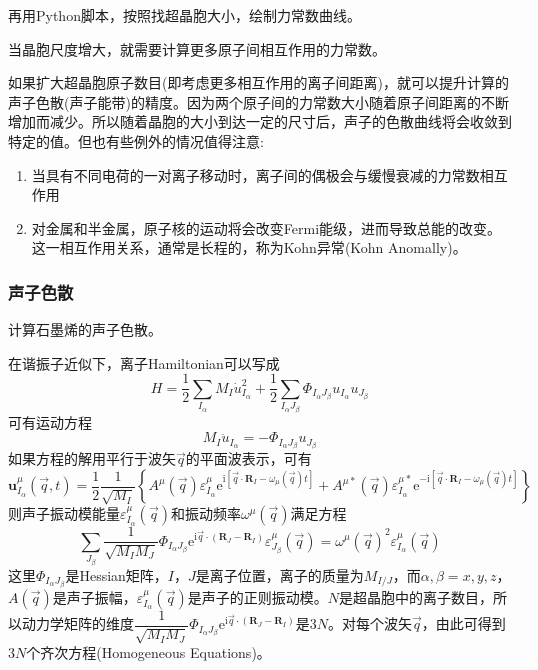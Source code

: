 再用\textrm{Python}脚本，按照找超晶胞大小，绘制力常数曲线。

当晶胞尺度增大，就需要计算更多原子间相互作用的力常数。

如果扩大超晶胞原子数目(即考虑更多相互作用的离子间距离)，就可以提升计算的声子色散(声子能带)的精度。因为两个原子间的力常数大小随着原子间距离的不断增加而减少。所以随着晶胞的大小到达一定的尺寸后，声子的色散曲线将会收敛到特定的值。但也有些例外的情况值得注意:
\begin{enumerate}
	\item 当具有不同电荷的一对离子移动时，离子间的偶极会与缓慢衰减的力常数相互作用
	\item 对金属和半金属，原子核的运动将会改变\textrm{Fermi}能级，进而导致总能的改变。这一相互作用关系，通常是长程的，称为\textrm{Kohn}异常\textrm{(Kohn Anomally)}。
\end{enumerate}

\subsubsection{声子色散}
计算石墨烯的声子色散。

在谐振子近似下，离子\textrm{Hamiltonian}可以写成
\begin{displaymath}
	H=\dfrac12\sum_{I_{\alpha}}M_I\dot{u}_{I_{\alpha}}^2+\dfrac12\sum_{I_{\alpha}J_{\beta}}\Phi_{I_{\alpha}J_{\beta}}u_{I_{\alpha}}u_{J_{\beta}}
\end{displaymath}
可有运动方程
\begin{displaymath}
	M_I\ddot{u}_{I_{\alpha}}=-\Phi_{I_{\alpha}J_{\beta}}u_{J_{\beta}}
\end{displaymath}
如果方程的解用平行于波矢$\vec q$的平面波表示，可有
\begin{displaymath}
	\mathbf{u}_{I_{\alpha}}^{\mu}(\vec q,t)=\dfrac12\dfrac1{\sqrt{M_I}}\left\{A^{\mu}(\vec q)\varepsilon_{I_{\alpha}}^{\mu}\mathrm{e}^{\mathrm{i}[\vec q\cdot\mathbf{R}_I-\omega_{\mu}(\vec q)t]}+A^{\mu\ast}(\vec q)\varepsilon_{I_{\alpha}}^{\mu\ast}\mathrm{e}^{-\mathrm{i}[\vec q\cdot\mathbf{R}_I-\omega_{\mu}(\vec q)t]}\right\}
\end{displaymath}
则声子振动模能量$\varepsilon_{I_{\alpha}}^{\mu}(\vec q)$和振动频率$\omega^{\mu}(\vec q)$满足方程
\begin{displaymath}
	\sum_{J_{\beta}}\dfrac1{\sqrt{M_IM_J}}\Phi_{I_{\alpha}J_{\beta}}\mathrm{e}^{\mathrm{i}\vec q\cdot(\mathbf{R}_J-\mathbf{R}_I)}\varepsilon_{J_{\beta}}^{\mu}(\vec q)=\omega^{\mu}(\vec q)^2\varepsilon_{I_{\alpha}}^{\mu}(\vec q)
\end{displaymath}
这里$\Phi_{I_{\alpha}J_{\beta}}$是\textrm{Hessian}矩阵，$I$，$J$是离子位置，离子的质量为$M_{I/J}$，而$\alpha,\beta=x,y,z$，$A(\vec q)$是声子振幅，$\varepsilon_{I_{\alpha}}^{\mu}(\vec q)$是声子的正则振动模。$N$是超晶胞中的离子数目，所以动力学矩阵的维度$\dfrac1{\sqrt{M_IM_J}}\Phi_{I_{\alpha}J_{\beta}}\mathrm{e}^{\mathrm{i}\vec q\cdot(\mathbf{R}_J-\mathbf{R}_I)}$是$3N$。对每个波矢$\vec q$，由此可得到$3N$个齐次方程\textrm{(Homogeneous Equations)}。

